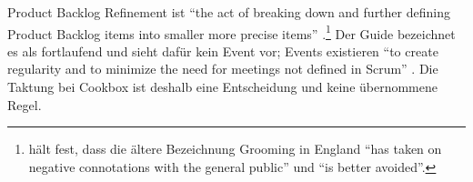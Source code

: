 %
%
%
%
Product Backlog Refinement ist \enquote{the act of breaking down and further
defining Product Backlog items into smaller more precise items}
\parencite[p.~10]{scrumguide2020}.\footnote{\textcite[ch.~8,
pp.~57--62]{kelly2019} hält fest, dass die ältere Bezeichnung Grooming in England
\enquote{has taken on negative connotations with the general public} und
\enquote{is better avoided}.} Der Guide bezeichnet es als fortlaufend und sieht
dafür kein Event vor; Events existieren \enquote{to create regularity and to
minimize the need for meetings not defined in Scrum} \parencite[p.~7]{scrumguide2020}. Die Taktung bei Cookbox ist
deshalb eine Entscheidung und keine übernommene Regel.

